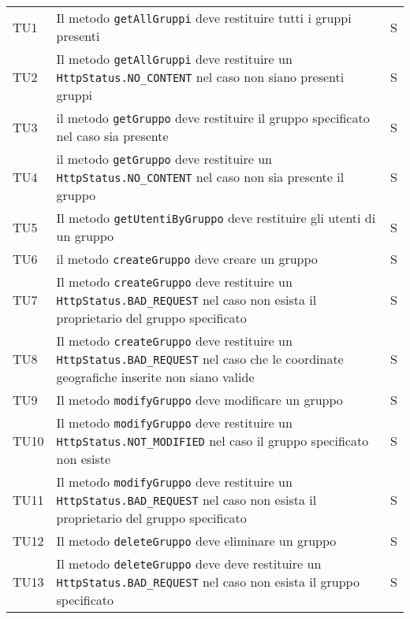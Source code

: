 \begin{center}
{\begin{longtable}{
        |>{\centering\arraybackslash}p{48pt}
        |>{\centering\arraybackslash}p{308pt}
        |>{\centering\arraybackslash}p{27pt}|}
        TU1                                & Il metodo \texttt{getAllGruppi} deve restituire tutti i gruppi presenti                                           & S \\
        TU2                                & Il metodo \texttt{getAllGruppi} deve restituire un \texttt{HttpStatus.NO\_CONTENT} nel caso non siano presenti gruppi                                      & S \\
        TU3                                & il metodo \texttt{getGruppo} deve restituire il gruppo specificato nel caso sia presente & S \\
        TU4                                & il metodo \texttt{getGruppo} deve restituire un \texttt{HttpStatus.NO\_CONTENT} nel caso non sia presente il gruppo & S \\
        TU5                                & Il metodo \texttt{getUtentiByGruppo} deve restituire gli utenti di un gruppo & S \\
        TU6                                & il metodo \texttt{createGruppo} deve creare un gruppo & S \\
        TU7                                & Il metodo \texttt{createGruppo} deve restituire un \texttt{ HttpStatus.BAD\_REQUEST} nel caso non esista il proprietario del gruppo specificato  & S \\
        TU8                                & Il metodo \texttt{createGruppo} deve restituire un \texttt{ HttpStatus.BAD\_REQUEST} nel caso che le coordinate geografiche inserite non siano valide & S \\
        TU9                                & Il metodo \texttt{modifyGruppo} deve modificare un gruppo & S \\
        TU10                                & Il metodo \texttt{modifyGruppo} deve restituire un \texttt{ HttpStatus.NOT\_MODIFIED} nel caso il gruppo specificato non esiste & S \\
        TU11                                & Il metodo \texttt{modifyGruppo} deve restituire un \texttt{ HttpStatus.BAD\_REQUEST} nel caso non esista il proprietario del gruppo specificato & S \\
        TU12                                & Il metodo \texttt{deleteGruppo} deve eliminare un gruppo & S \\
        TU13                                & Il metodo \texttt{deleteGruppo} deve deve restituire un \texttt{ HttpStatus.BAD\_REQUEST} nel caso non esista il gruppo specificato   & S \\

\end{longtable}}
\end{center}

